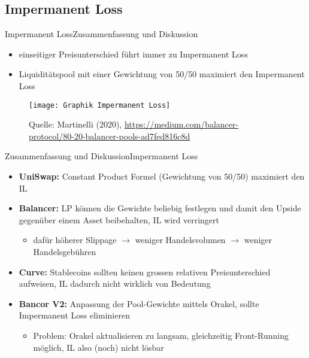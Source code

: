 \documentclass{beamer}
\begin{document}
\subsection{Impermanent Loss}
\begin{frame}{Impermanent Loss}{Zusammenfassung und Diskussion}
 \begin{itemize}
  \item{einseitiger Preisunterschied führt immer zu Impermanent Loss}
  \item{Liquiditätspool mit einer Gewichtung von 50/50 maximiert den Impermanent Loss}
 \end{itemize}
\begin{center}
\begin{figure}
 \texttt{[image: Graphik Impermanent Loss]}
 \caption{\tiny{Quelle: Martinelli (2020), \url{https://medium.com/balancer-protocol/80-20-balancer-pools-ad7fed816c8d}}}
\end{figure}
 \end{center}
\end{frame}

\begin{frame}{Zusammenfassung und Diskussion}{Impermanent Loss}
\begin{itemize}
 \item<1->{\textbf{UniSwap:} Constant Product Formel (Gewichtung von 50/50) maximiert den IL}
 \item<2->{\textbf{Balancer:} LP können die Gewichte beliebig festlegen und damit den Upside gegenüber einem Asset beibehalten, IL wird verringert}
 	\begin{itemize}
 	\item<2->{dafür höherer Slippage $\rightarrow$ weniger Handelsvolumen $\rightarrow$ weniger Handelsgebühren}
 	\end{itemize}
 \item<3->{\textbf{Curve:} Stablecoins sollten keinen grossen relativen Preisunterschied aufweisen, IL dadurch nicht wirklich von Bedeutung}
 \item<4->{\textbf{Bancor V2:} Anpassung der Pool-Gewichte mittels Orakel, sollte Impermanent Loss eliminieren}
 \begin{itemize}
 \item{Problem: Orakel aktualisieren zu langsam, gleichzeitig Front-Running möglich, IL also (noch) nicht lösbar}
 \end{itemize}
\end{itemize}  
\end{frame}
\end{document}

